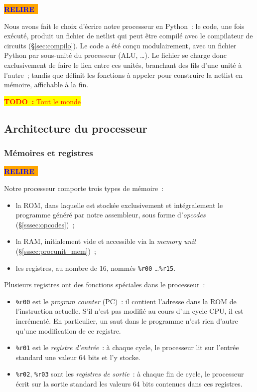 \documentclass[11pt,a4paper]{article}
\newcommand{\htodo}[1]{\begin{huge}\colorbox{yellow}{\textcolor{red}{\textbf{TODO~:} #1}}\end{huge}}
\newcommand{\relire}{\colorbox{orange}{\textcolor{blue}{\textbf{RELIRE}~}}}
\begin{document}
\relire

Nous avons fait le choix d'écrire notre processeur en Python~: le code, une fois exécuté, produit un fichier de netlist qui peut être compilé avec le compilateur de circuits (§\ref{sec:compilo}). Le code a été conçu modulairement, avec un fichier Python par sous-unité du processeur (ALU, \ldots). Le fichier  se charge donc exclusivement de faire le lien entre ces unités, \og branchant \fg{} des fils d'une unité à l'autre~; tandis que  définit les fonctions à appeler pour construire la netlist en mémoire, affichable à la fin.

\htodo{Tout le monde}

\subsection{Architecture du processeur}

\subsubsection{Mémoires et registres} \label{sssec:memory}
\relire

\noindent Notre processeur comporte trois types de mémoire~:
\begin{itemize}
\item la ROM, dans laquelle est stockée exclusivement et intégralement le programme généré par notre assembleur, sous forme d'\textit{opcodes} (§\ref{sssec:opcodes})~;

\item la RAM, initialement vide et accessible via la \textit{memory unit} (§\ref{sssec:procunit_mem})~;
\item les registres, au nombre de 16, nommés \texttt{\%r00} \ldots \texttt{\%r15}.
\end{itemize}

\noindent Plusieurs registres ont des fonctions spéciales dans le processeur~:
\begin{itemize}
\item \texttt{\%r00} est le \emph{program counter} (PC)~: il contient l'adresse dans la ROM de l'instruction actuelle. S'il n'est pas modifié au cours d'un cycle CPU, il est incrémenté. En particulier, un saut dans le programme n'est rien d'autre qu'une modification de ce registre.
\item \texttt{\%r01} est le \emph{registre d'entrée}~: à chaque cycle, le processeur lit sur l'entrée standard une valeur 64 bits et l'y stocke.
\item \texttt{\%r02}, \texttt{\%r03} sont les \emph{registres de sortie}~: à chaque fin de cycle, le processeur écrit sur la sortie standard les valeurs 64 bits contenues dans ces registres.
\end{itemize}
\end{document}
